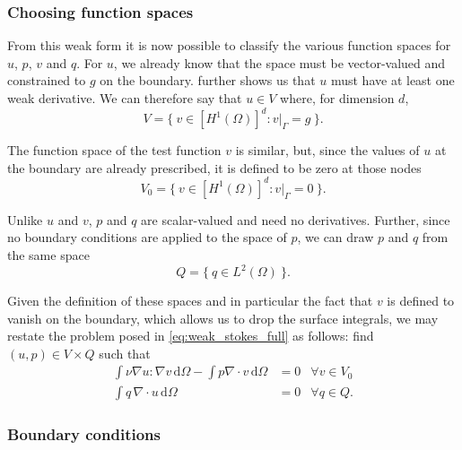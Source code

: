 \documentclass[thesis]{subfiles}
\begin{document}
\subsubsection{Choosing function spaces}

From this weak form it is now possible to classify the various function spaces for $u$, $p$, $v$ and $q$.
For $u$, we already know that the space must be vector-valued and constrained to $g$ on the boundary.
 further shows us that $u$ must have at least one weak derivative.
We can therefore say that $u \in V$ where, for dimension $d$,
\begin{equation}
  V = \{ \ v \in [H^1(\Omega)]^d : v |_{\Gamma} = g \ \}.
\end{equation}

The function space of the test function $v$ is similar, but, since the values of $u$ at the boundary are already prescribed, it is defined to be zero at those nodes
\begin{equation} \label{eq:vspace}
  V_0 = \{\ v \in [H^1(\Omega)]^d : v|_{\Gamma} = 0 \ \}.
\end{equation}

Unlike $u$ and $v$, $p$ and $q$ are scalar-valued and need no derivatives.
Further, since no boundary conditions are applied to the space of $p$, we can draw $p$ and $q$ from the same space
\begin{equation}
  Q = \{ \ q \in L^2(\Omega) \ \}.
  \label{eq:stokes_pressure_space}
\end{equation}

Given the definition of these spaces and in particular the fact that $v$ is defined to vanish on the boundary, which allows us to drop the surface integrals, we may restate the problem posed in \cref{eq:weak_stokes_full} as follows: find $(u, p) \in V \times Q$ such that
\begin{equation} \label{eq:weak_stokes_no_surface_terms}
  \begin{aligned}
    \int \nu \nabla u : \nabla v \, \textrm{d}\Omega
    - \int p \nabla \cdot v \, \textrm{d}\Omega
    &= 0
    &\forall v \in V_0 \\
    \int q \, \nabla \cdot u \, \textrm{d}\Omega
    &= 0
    &\forall q \in Q.
  \end{aligned}
\end{equation}

\subsubsection{Boundary conditions}
\end{document}
